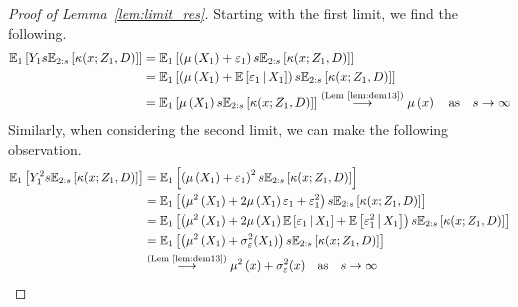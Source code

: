 \begin{proof}[Proof of Lemma~\ref{lem:limit_res}]
	Starting with the first limit, we find the following.
	\begin{equation}
		\begin{aligned}
			\mathbb{E}_{1}\left[Y_1 s \mathbb{E}_{2:s}\left[\kappa(x; Z_1, D)\right]\right]
			 & = \mathbb{E}_{1}\left[\left(\mu\left(X_1\right) + \varepsilon_1\right) s \mathbb{E}_{2:s}\left[\kappa(x; Z_1, D)\right]\right]                                   \\
			 & = \mathbb{E}_{1}\left[\left(\mu\left(X_1\right) + \mathbb{E}\left[\varepsilon_1 \, \middle| \, X_1\right]\right) s \mathbb{E}_{2:s}\left[\kappa(x; Z_1, D)\right]\right] \\
			 & = \mathbb{E}_{1}\left[\mu\left(X_1\right) s \mathbb{E}_{2:s}\left[\kappa(x; Z_1, D)\right]\right]
			\overset{\text{(Lem~\ref{lem:dem13})}}{\longrightarrow} \mu\left(x\right)
			\quad \text{as} \quad s \rightarrow \infty
		\end{aligned}
	\end{equation}
	Similarly, when considering the second limit, we can make the following observation.
	\begin{equation}
		\begin{aligned}
			\E_{1}\left[Y_1^2 s \E_{2:s}\left[\kappa(x; Z_1, D)\right]\right]
			 & = \E_{1}\left[\left(\mu\left(X_1\right) + \varepsilon_1\right)^2 s \E_{2:s}\left[\kappa(x; Z_1, D)\right]\right]                                                            \\
			 & = \E_{1}\left[\left(\mu^2\left(X_1\right) + 2\mu\left(X_1\right)\varepsilon_1 + \varepsilon_1^2\right)s \E_{2:s}\left[\kappa(x; Z_1, D)\right]\right]                       \\
			 & = \E_{1}\left[\left(\mu^2\left(X_1\right) + 2\mu\left(X_1\right) \E\left[\varepsilon_1 \, \middle| \, X_1\right] + \E\left[\varepsilon_1^2 \, \middle| \, X_1\right]\right)
			s \E_{2:s}\left[\kappa(x; Z_1, D)\right]\right]                                                                                                                                \\
			 & = \E_{1}\left[\left(\mu^2\left(X_1\right) +\sigma_{\varepsilon}^{2}(X_1)\right) s \E_{2:s}\left[\kappa(x; Z_1, D)\right]\right]                                             \\
			 & \overset{\text{(Lem~\ref{lem:dem13})}}{\longrightarrow} \mu^2\left(x\right) +\sigma_{\varepsilon}^{2}(x)
			\quad \text{as} \quad s \rightarrow \infty
		\end{aligned}

\end{equation}
\end{proof}
